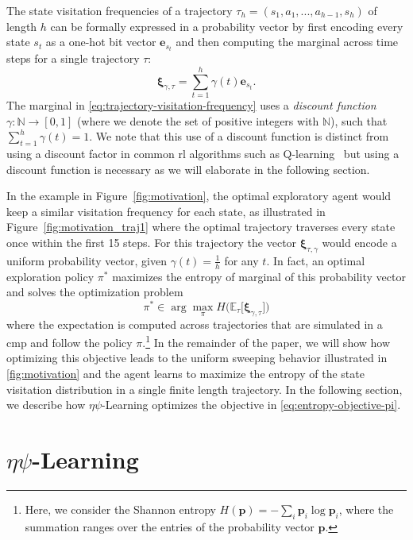 \documentclass{article}
\theoremstyle{plain}
\theoremstyle{definition}
\theoremstyle{remark}
\newcommand{\alg}{$\eta$$\psi$-Learning}
\begin{document}
The state visitation frequencies of a trajectory $\tau_h=(s_1,a_1,...,a_{h-1},s_h)$ of length $h$ can be formally expressed in a probability vector by first encoding every state $s_t$ as a one-hot bit vector $\pmb{e}_{s_t}$ and then computing the marginal across time steps for a single trajectory $\tau$:    
\begin{equation}
    \pmb{\xi}_{\gamma,\tau} = \sum_{t=1}^h \gamma(t) \pmb{e}_{s_t}. \label{eq:trajectory-visitation-frequency}
\end{equation}
The marginal in \autoref{eq:trajectory-visitation-frequency} uses a \emph{discount function} $\gamma: \mathbb{N} \to [0, 1]$ (where we denote the set of positive integers with $\mathbb{N}$), such that $\sum_{t=1}^h \gamma(t)=1$. 
We note that this use of a discount function is distinct from using a discount factor in common \gls{rl} algorithms such as Q-learning~\cite{watkins1992qlearning} but using a discount function is necessary as we will elaborate in the following section.

In the example in Figure~\ref{fig:motivation}, the optimal exploratory agent would keep a similar visitation frequency for each state, as illustrated in Figure~\ref{fig:motivation_traj1} where the optimal trajectory traverses every state once within the first 15 steps.
For this trajectory the vector $\pmb{\xi}_{\tau,\gamma}$ would encode a uniform probability vector, given $\gamma(t)=\frac{1}{h}$ for any $t$.
In fact, an optimal exploration policy $\pi^*$ maximizes the entropy of marginal of this probability vector and solves the optimization problem
\begin{equation}
    \pi^* \in \arg \max_\pi H \big( \mathbb{E}_{\tau} \big[ \pmb{\xi}_{\gamma,\tau} \big] \big) \label{eq:entropy-objective-pi}
\end{equation}
where the expectation is computed across trajectories that are simulated in a \gls{cmp} and follow the policy $\pi$.\footnote{
    Here, we consider the Shannon entropy $H(\pmb{p}) = -\sum_i \pmb{p}_i \log \pmb{p}_i$, where the summation ranges over the entries of the probability vector $\pmb{p}$.
}
In the remainder of the paper, we will show how optimizing this objective leads to the uniform sweeping behavior illustrated in \autoref{fig:motivation} and the agent learns to maximize the entropy of the state visitation distribution in a single finite length trajectory.
In the following section, we describe how \alg{} optimizes the objective in \autoref{eq:entropy-objective-pi}.

\section{\alg{}}
\label{sec:algo}
\end{document}
